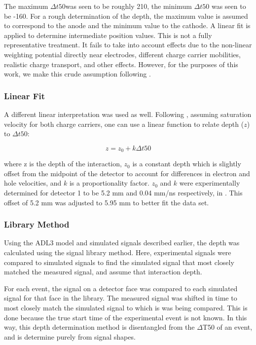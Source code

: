 The maximum $\Delta t50$was seen to be roughly 210, the minimum $\Delta t50$ was seen to be -160. For a rough determination of the depth, the maximum value is assumed to correspond to the anode and the minimum value to the cathode. A linear fit is applied to determine intermediate position values. This is not a fully representative treatment. It fails to take into account effects due to the non-linear weighting potential directly near electrodes, different charge carrier mobilities, realistic charge transport, and other effects. However, for the purposes of this work, we make this crude assumption following \cite{amman}.

\subsubsection*{Linear Fit}

A different linear interpretation was used as well. Following \cite{cci21}, assuming saturation velocity for both charge carriers, one can use a linear function to relate depth ($z$) to $\Delta t50$:

\begin{equation}
z = z_0 + k \Delta t50
\end{equation}

where z is the depth of the interaction, $z_0$ is a constant depth which is slightly offset from the midpoint of the detector to account for differences in electron and hole velocities, and $k$ is a proportionality factor. $z_0$ and $k$ were experimentally determined for detector 1 to be 5.2 mm and 0.04 mm/ns respectively, in \cite{cci21}. This offset of 5.2 mm was adjusted to 5.95 mm to better fit the data set.

\subsubsection*{Library Method}

Using the ADL3 model and simulated signals described earlier, the depth was calculated using the signal library method. Here, experimental signals were compared to simulated signals to find the simulated signal that most closely matched the measured signal, and assume that interaction depth.

For each event, the signal on a detector face was compared to each simulated signal for that face in the library. The measured signal was shifted in time to most closely match the simulated signal to which is was being compared. This is done because the true start time of the experimental event is not known. In this way, this depth determination method is disentangled from the $\Delta$T50 of an event, and is determine purely from signal shapes.

